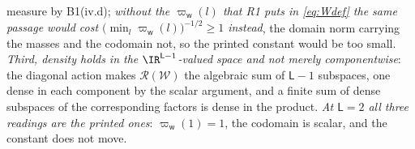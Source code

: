 \begin{lemma}
\begin{enumerate}
measure by B1(iv.d); \emph{without the $\varpi_{\mathsf w}(l)$ that R1 puts in \eqref{eq:Wdef} the same
passage would cost $\big(\min_l\varpi_{\mathsf w}(l)\big)^{-1/2}\ge1$ instead}, the domain norm carrying
the masses and the codomain not, so the printed constant would be too small. \emph{Third, density holds
in the $\IR^{\mathsf L-1}$-valued space and not merely componentwise}: the diagonal action makes
$\mathcal R(\mathcal W)$ the algebraic sum of $\mathsf L-1$ subspaces, one dense in each component by
the scalar argument, and a finite sum of dense subspaces of the corresponding factors is dense in the
product. \emph{At $\mathsf L=2$ all three readings are the printed ones}: $\varpi_{\mathsf w}(1)=1$, the
codomain is scalar, and the constant does not move.
%
%
%
%

\end{enumerate}
\end{lemma}
